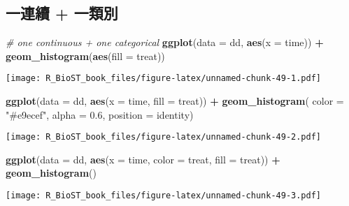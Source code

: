 \documentclass[
]{book}
\newenvironment{Shaded}{\begin{snugshade}}{\end{snugshade}}
\newcommand{\CommentTok}[1]{\textcolor[rgb]{0.56,0.35,0.01}{\textit{#1}}}
\newcommand{\DataTypeTok}[1]{\textcolor[rgb]{0.13,0.29,0.53}{#1}}
\newcommand{\FloatTok}[1]{\textcolor[rgb]{0.00,0.00,0.81}{#1}}
\newcommand{\KeywordTok}[1]{\textcolor[rgb]{0.13,0.29,0.53}{\textbf{#1}}}
\newcommand{\NormalTok}[1]{#1}
\newcommand{\OperatorTok}[1]{\textcolor[rgb]{0.81,0.36,0.00}{\textbf{#1}}}
\newcommand{\StringTok}[1]{\textcolor[rgb]{0.31,0.60,0.02}{#1}}
\begin{document}
\hypertarget{ux4e00ux9023ux7e8c-ux4e00ux985eux5225}{%
\subsection{一連續 + 一類別}\label{ux4e00ux9023ux7e8c-ux4e00ux985eux5225}}

\begin{Shaded}
\begin{Highlighting}[]
\CommentTok{\# one continuous + one categorical}
\KeywordTok{ggplot}\NormalTok{(}\DataTypeTok{data =}\NormalTok{ dd, }\KeywordTok{aes}\NormalTok{(}\DataTypeTok{x =}\NormalTok{ time)) }\OperatorTok{+}\StringTok{ }
\StringTok{  }\KeywordTok{geom\_histogram}\NormalTok{(}\KeywordTok{aes}\NormalTok{(}\DataTypeTok{fill =}\NormalTok{ treat))}
\end{Highlighting}
\end{Shaded}

\texttt{[image: R\_BioST\_book\_files/figure-latex/unnamed-chunk-49-1.pdf]}

\begin{Shaded}
\begin{Highlighting}[]
\KeywordTok{ggplot}\NormalTok{(}\DataTypeTok{data =}\NormalTok{ dd, }\KeywordTok{aes}\NormalTok{(}\DataTypeTok{x =}\NormalTok{ time, }\DataTypeTok{fill =}\NormalTok{ treat)) }\OperatorTok{+}
\StringTok{    }\KeywordTok{geom\_histogram}\NormalTok{( }\DataTypeTok{color =} \StringTok{"\#e9ecef"}\NormalTok{, }
                    \DataTypeTok{alpha =} \FloatTok{0.6}\NormalTok{, }
                    \DataTypeTok{position =} \StringTok{\textquotesingle{}identity\textquotesingle{}}\NormalTok{)}
\end{Highlighting}
\end{Shaded}

\texttt{[image: R\_BioST\_book\_files/figure-latex/unnamed-chunk-49-2.pdf]}

\begin{Shaded}
\begin{Highlighting}[]
\KeywordTok{ggplot}\NormalTok{(}\DataTypeTok{data =}\NormalTok{ dd, }\KeywordTok{aes}\NormalTok{(}\DataTypeTok{x =}\NormalTok{ time, }\DataTypeTok{color =}\NormalTok{ treat, }\DataTypeTok{fill =}\NormalTok{ treat)) }\OperatorTok{+}
\StringTok{    }\KeywordTok{geom\_histogram}\NormalTok{()}
\end{Highlighting}
\end{Shaded}

\texttt{[image: R\_BioST\_book\_files/figure-latex/unnamed-chunk-49-3.pdf]}
\end{document}
